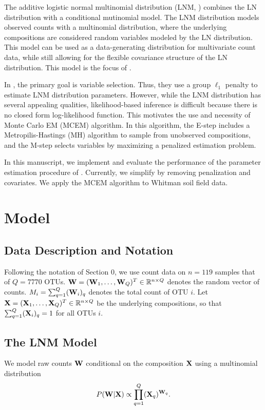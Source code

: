 \documentclass{template}
\begin{document}
The additive logistic normal multinomial distribution (LNM, \cite{billheimer2001statistical}) combines the LN distribution with a conditional mutinomial model. The LNM distribution models observed counts with a multinomial distribution, where the underlying compositions are considered random variables modeled by the LN distribution. This model can be used as a data-generating distribution for multivariate count data, while still allowing for the flexible covariance structure of the LN distribution. This model is the focus of  \cite{xia2013logistic}.

In \cite{xia2013logistic}, the primary goal is variable selection. Thus, they use a group $\ell_1$ penalty to estimate LNM distribution parameters. However, while the LNM distribution has several appealing qualities, likelihood-based inference is difficult because there is no closed form log-likelihood function. This motivates the use and necessity of Monte Carlo EM (MCEM) algorithm. In this algorithm, the E-step includes a  Metropilis-Hastings (MH) algorithm to sample from unobserved compositions, and the M-step selects variables by maximizing a penalized estimation problem.

In this manuscript, we implement and evaluate the performance of the parameter estimation procedure of \cite{xia2013logistic}. Currently, we simplify by removing penalization and covariates. We apply the MCEM algorithm to Whitman soil field data.


\section{Model}
\subsection{Data Description and Notation}
Following the notation of Section 0, we use count data on $n=119$ samples that of $Q=7770$ OTUs. $\mathbf{W}=(\mathbf{W}_1,\ldots,\mathbf{W}_{Q})^T\in\mathbb{R}^{n\times Q}$ denotes the random vector of counts. $M_i=\sum_{q=1}^{Q} (\mathbf{W}_i)_q$ denotes the total count of OTU $i$. Let $\mathbf{X}=(\mathbf{X}_1,\ldots,\mathbf{X}_{Q})^T\in\mathbb{R}^{n\times Q}$ be the underlying compositions, so that $\sum_{q=1}^Q (\mathbf{X}_{i})_q=1$ for all OTUs $i$.

\subsection{The LNM Model}
We model raw counts $\mathbf{W}$ conditional on the composition $\mathbf{X}$ using a multinomial distribution
$$P(\mathbf{W}|\mathbf{X})\propto \prod_{q=1}^{Q} (\mathbf{X}_q)^{\mathbf{W}_q}.$$
\end{document}
